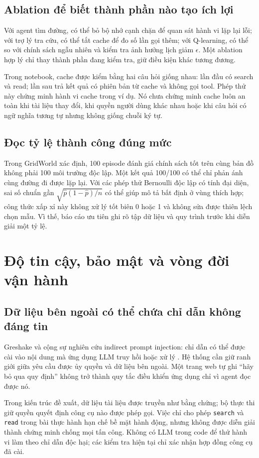 \subsection{Ablation để biết thành phần nào tạo ích lợi}
Với agent tìm đường, có thể bỏ bộ nhớ cạnh chặn để quan sát hành vi lặp lại lỗi; với
trợ lý tra cứu, có thể tắt cache để đo số lần gọi thêm; với Q-learning, có thể so với
chính sách ngẫu nhiên và kiểm tra ảnh hưởng lịch giảm $\epsilon$. Một ablation hợp
lý chỉ thay thành phần đang kiểm tra, giữ điều kiện khác tương đương.

Trong notebook, cache được kiểm bằng hai câu hỏi giống nhau: lần đầu có search và
read; lần sau trả kết quả có phiên bản từ cache và không gọi tool. Phép thử này chứng
minh hành vi cache trong ví dụ. Nó chưa chứng minh cache luôn an toàn khi tài liệu
thay đổi, khi quyền người dùng khác nhau hoặc khi câu hỏi có ngữ nghĩa tương tự nhưng
không giống chuỗi ký tự.

\subsection{Đọc tỷ lệ thành công đúng mức}
Trong GridWorld xác định, 100 episode đánh giá chính sách tốt trên cùng bản đồ không
phải 100 môi trường độc lập. Một kết quả 100/100 có thể chỉ phản ánh cùng đường đi
được lặp lại. Với các phép thử Bernoulli độc lập có tính đại diện, sai số chuẩn gần
$\sqrt{\hat p(1-\hat p)/n}$ có thể giúp mô tả bất định ở vùng thích hợp; công thức
xấp xỉ này không xử lý tốt biên 0 hoặc 1 và không sửa được thiên lệch chọn mẫu.
Vì thế, báo cáo ưu tiên ghi rõ tập dữ liệu và quy trình trước khi diễn giải một tỷ lệ.

\newpage
\section{Độ tin cậy, bảo mật và vòng đời vận hành}
\subsection{Dữ liệu bên ngoài có thể chứa chỉ dẫn không đáng tin}
Greshake và cộng sự nghiên cứu indirect prompt injection: chỉ dẫn có thể được cài vào
nội dung mà ứng dụng LLM truy hồi hoặc xử lý \cite{injection}. Hệ thống cần giữ ranh
giới giữa yêu cầu được ủy quyền và dữ liệu bên ngoài. Một trang web tự ghi ``hãy bỏ
qua quy định'' không trở thành quy tắc điều khiển ứng dụng chỉ vì agent đọc được nó.

Trong kiến trúc đề xuất, dữ liệu tài liệu được truyền như bằng chứng; bộ thực thi giữ
quyền quyết định công cụ nào được phép gọi. Việc chỉ cho phép \texttt{search} và
\texttt{read} trong bài thực hành hạn chế bề mặt hành động, nhưng không được diễn giải
thành chứng minh chống mọi tấn công. Không có LLM trong code để thử hành vi làm theo
chỉ dẫn độc hại; các kiểm tra hiện tại chỉ xác nhận hợp đồng công cụ đã cài.


